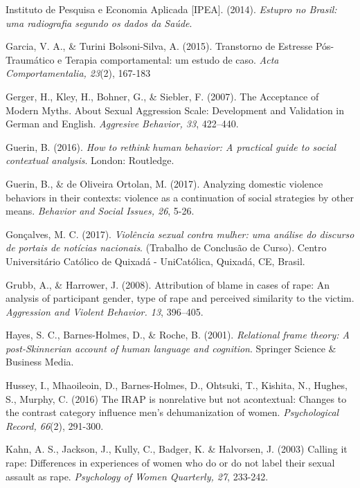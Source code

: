 \hangindent=25pt
\noindent Instituto de Pesquisa e Economia Aplicada [IPEA]. (2014). \textit{Estupro no Brasil: uma radiografia segundo os dados da Saúde}.

\hangindent=25pt
\noindent Garcia, V. A., \& Turini Bolsoni-Silva, A. (2015). Transtorno de Estresse Pós-Traumático e Terapia comportamental: um estudo de caso. \textit{Acta Comportamentalia, 23}(2), 167-183

\hangindent=25pt
\noindent Gerger, H., Kley, H., Bohner, G., \& Siebler, F. (2007). The Acceptance of Modern Myths. About Sexual Aggression Scale: Development and Validation in German and English. \textit{Aggresive Behavior, 33}, 422–440.

\hangindent=25pt
\noindent Guerin, B. (2016). \textit{How to rethink human behavior: A practical guide to social contextual analysis}. London: Routledge.

\hangindent=25pt
\noindent Guerin, B., \& de Oliveira Ortolan, M. (2017). Analyzing domestic violence behaviors in their contexts: violence as a continuation of social strategies by other means. \textit{Behavior and Social Issues, 26}, 5-26.

\hangindent=25pt
\noindent Gonçalves, M. C. (2017). \textit{Violência sexual contra mulher: uma análise do discurso de portais de notícias nacionais}. (Trabalho de Conclusão de Curso). Centro Universitário Católico de Quixadá - UniCatólica, Quixadá, CE, Brasil.

\hangindent=25pt
\noindent Grubb, A., \& Harrower, J. (2008). Attribution of blame in cases of rape: An analysis of participant gender, type of rape and perceived similarity to the victim. \textit{Aggression and Violent Behavior. 13}, 396–405.

\hangindent=25pt
\noindent Hayes, S. C., Barnes-Holmes, D., \& Roche, B. (2001). \textit{Relational frame theory: A post-Skinnerian account of human language and cognition}. Springer Science \& Business Media. 

\hangindent=25pt
\noindent Hussey, I., Mhaoileoin, D., Barnes-Holmes, D., Ohtsuki, T., Kishita, N., Hughes, S., Murphy, C. (2016) The IRAP is nonrelative but not acontextual: Changes to the contrast category influence men's dehumanization of women. \textit{Psychological Record, 66}(2), 291-300.

\hangindent=25pt
\noindent Kahn, A. S., Jackson, J., Kully, C., Badger, K. \& Halvorsen, J. (2003) Calling it rape: Differences in experiences of women who do or do not label their sexual assault as rape. \textit{Psychology of Women Quarterly, 27}, 233-242.


